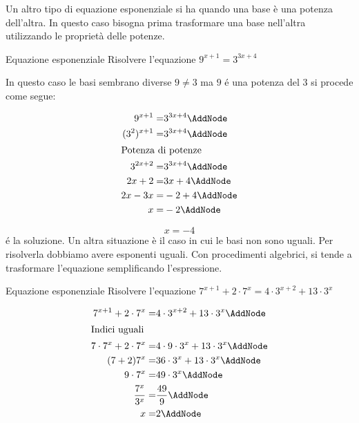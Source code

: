 Un altro tipo di equazione esponenziale si ha quando una base è una potenza dell'altra. In questo caso bisogna prima trasformare una base nell'altra utilizzando le proprietà delle potenze.
\begin{esempiot}{Equazione esponenziale}{}
	Risolvere l'equazione $9^{x+1}=3^{3x+4}$
\end{esempiot}\newpage In questo caso le basi sembrano diverse $9\neq 3$ ma $9$ \'{e} una potenza del $3$ si procede come segue:
	\begin{NodesList}%
		\begin{align*}
			9^{x+1}=&3^{3x+4}\AddNode\\
			(3^2)^{x+1}=&3^{3x+4}\AddNode\\
			\intertext{Potenza di potenze}
			3^{2x+2}=&3^{3x+4}\AddNode\\
			2x+2=&3x+4\AddNode\\
			2x-3x=&-2+4\AddNode\\
			x=&-2\AddNode
		\end{align*}
		\LinkNodes{}%
	\end{NodesList}
	\[x=-4\]
	\'{e} la soluzione.
Un altra situazione è il caso in cui le basi non sono uguali. Per risolverla dobbiamo avere esponenti uguali. Con procedimenti algebrici, si tende a trasformare l'equazione semplificando l'espressione. 
\begin{esempiot}{Equazione esponenziale}{}
	Risolvere l'equazione $7^{x+1}+2\cdot7^{x}=4\cdot3^{x+2}+13\cdot 3^x$
\end{esempiot}
	\begin{NodesList}%
		\begin{align*}
			7^{x+1}+2\cdot7^{x}=&4\cdot3^{x+2}+13\cdot 3^x\AddNode\\
			\intertext{Indici uguali}
			7\cdot7^x+2\cdot7^x=&4\cdot9\cdot3^x+13\cdot3^x\AddNode\\
			(7+2)7^x=&36\cdot3^x+13\cdot3^x\AddNode\\
			9\cdot7^x=&49\cdot3^x\AddNode\\
			\dfrac{7^x}{3^x}=&\dfrac{49}{9}\AddNode\\
			x=&2\AddNode
		\end{align*}
	\end{NodesList}
